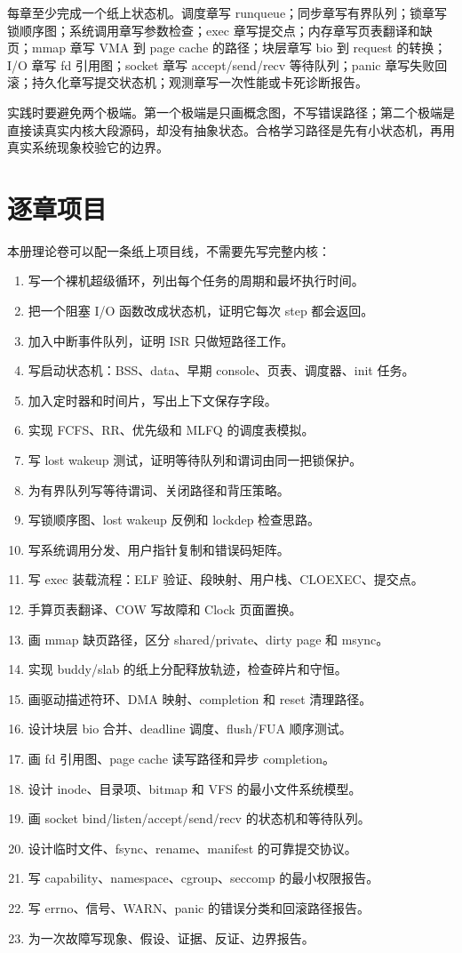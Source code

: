 每章至少完成一个纸上状态机。调度章写 runqueue；同步章写有界队列；锁章写锁顺序图；系统调用章写参数检查；exec 章写提交点；内存章写页表翻译和缺页；mmap 章写 VMA 到 page cache 的路径；块层章写 bio 到 request 的转换；I/O 章写 fd 引用图；socket 章写 accept/send/recv 等待队列；panic 章写失败回滚；持久化章写提交状态机；观测章写一次性能或卡死诊断报告。

实践时要避免两个极端。第一个极端是只画概念图，不写错误路径；第二个极端是直接读真实内核大段源码，却没有抽象状态。合格学习路径是先有小状态机，再用真实系统现象校验它的边界。

\section{逐章项目}

本册理论卷可以配一条纸上项目线，不需要先写完整内核：

\begin{enumerate}
\tightlist
\item 写一个裸机超级循环，列出每个任务的周期和最坏执行时间。
\item 把一个阻塞 I/O 函数改成状态机，证明它每次 step 都会返回。
\item 加入中断事件队列，证明 ISR 只做短路径工作。
\item 写启动状态机：BSS、data、早期 console、页表、调度器、init 任务。
\item 加入定时器和时间片，写出上下文保存字段。
\item 实现 FCFS、RR、优先级和 MLFQ 的调度表模拟。
\item 写 lost wakeup 测试，证明等待队列和谓词由同一把锁保护。
\item 为有界队列写等待谓词、关闭路径和背压策略。
\item 写锁顺序图、lost wakeup 反例和 lockdep 检查思路。
\item 写系统调用分发、用户指针复制和错误码矩阵。
\item 写 exec 装载流程：ELF 验证、段映射、用户栈、CLOEXEC、提交点。
\item 手算页表翻译、COW 写故障和 Clock 页面置换。
\item 画 mmap 缺页路径，区分 shared/private、dirty page 和 msync。
\item 实现 buddy/slab 的纸上分配释放轨迹，检查碎片和守恒。
\item 画驱动描述符环、DMA 映射、completion 和 reset 清理路径。
\item 设计块层 bio 合并、deadline 调度、flush/FUA 顺序测试。
\item 画 fd 引用图、page cache 读写路径和异步 completion。
\item 设计 inode、目录项、bitmap 和 VFS 的最小文件系统模型。
\item 画 socket bind/listen/accept/send/recv 的状态机和等待队列。
\item 设计临时文件、fsync、rename、manifest 的可靠提交协议。
\item 写 capability、namespace、cgroup、seccomp 的最小权限报告。
\item 写 errno、信号、WARN、panic 的错误分类和回滚路径报告。
\item 为一次故障写现象、假设、证据、反证、边界报告。
\end{enumerate}

